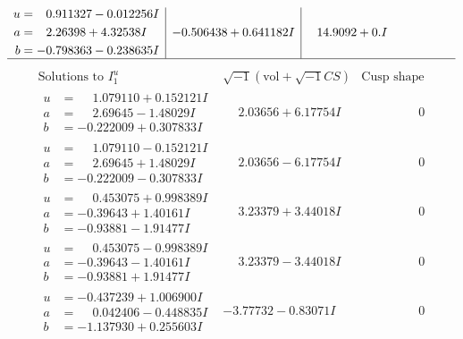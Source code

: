 \documentclass[1p]{elsarticle_modified}
\theoremstyle{definition}
\newcommand{\I}{\sqrt{-1}}
\begin{document}
$$\begin{array}{c|c|c}
\begin{aligned}
u &= \phantom{-}0.911327 - 0.012256 I \\
a &= \phantom{-}2.26398 + 4.32538 I \\
b &= -0.798363 - 0.238635 I\end{aligned}
 & -0.506438 + 0.641182 I & \phantom{-}14.9092 + 0. I\phantom{ +0.000000I}\\
 \hline 
 \end{array}$$\newpage$$\begin{array}{c|c|c}  
\text{Solutions to }I^u_{1}& \I (\text{vol} + \sqrt{-1}CS) & \text{Cusp shape}\\
 \hline 
\begin{aligned}
u &= \phantom{-}1.079110 + 0.152121 I \\
a &= \phantom{-}2.69645 - 1.48029 I \\
b &= -0.222009 + 0.307833 I\end{aligned}
 & \phantom{-}2.03656 + 6.17754 I & \phantom{-0.000000 } 0 \\ \hline\begin{aligned}
u &= \phantom{-}1.079110 - 0.152121 I \\
a &= \phantom{-}2.69645 + 1.48029 I \\
b &= -0.222009 - 0.307833 I\end{aligned}
 & \phantom{-}2.03656 - 6.17754 I & \phantom{-0.000000 } 0 \\ \hline\begin{aligned}
u &= \phantom{-}0.453075 + 0.998389 I \\
a &= -0.39643 + 1.40161 I \\
b &= -0.93881 - 1.91477 I\end{aligned}
 & \phantom{-}3.23379 + 3.44018 I & \phantom{-0.000000 } 0 \\ \hline\begin{aligned}
u &= \phantom{-}0.453075 - 0.998389 I \\
a &= -0.39643 - 1.40161 I \\
b &= -0.93881 + 1.91477 I\end{aligned}
 & \phantom{-}3.23379 - 3.44018 I & \phantom{-0.000000 } 0 \\ \hline\begin{aligned}
u &= -0.437239 + 1.006900 I \\
a &= \phantom{-}0.042406 - 0.448835 I \\
b &= -1.137930 + 0.255603 I\end{aligned}
 & -3.77732 - 0.83071 I & \phantom{-0.000000 } 0 \\ \hline\begin{aligned}

\end{aligned}
\end{array}$$
\end{document}
